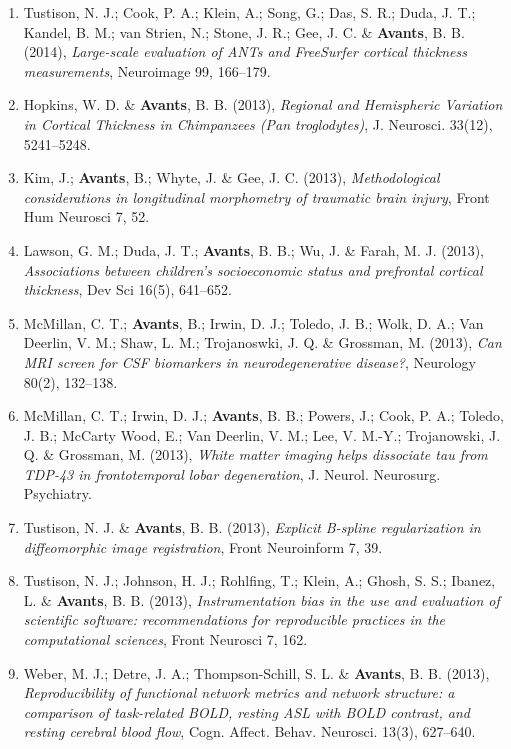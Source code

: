 \documentclass[11pt]{moderncv} %
\begin{document}
\begin{enumerate}
\item  Tustison, N. J.; Cook, P. A.; Klein, A.; Song, G.; Das, S. R.; Duda, J. T.; Kandel, B. M.; van Strien, N.; Stone, J. R.; Gee, J. C. \&  \textbf{Avants}, B. B. (2014), \textit{Large-scale evaluation of ANTs and FreeSurfer cortical thickness measurements}, Neuroimage 99, 166--179.

\item  Hopkins, W. D. \&  \textbf{Avants}, B. B. (2013), \textit{Regional and Hemispheric Variation in Cortical Thickness in Chimpanzees (Pan troglodytes)}, J. Neurosci. 33(12), 5241--5248.

\item  Kim, J.; \textbf{Avants}, B.; Whyte, J. \&  Gee, J. C. (2013), \textit{Methodological considerations in longitudinal morphometry of traumatic brain injury}, Front Hum Neurosci 7, 52.

\item  Lawson, G. M.; Duda, J. T.; \textbf{Avants}, B. B.; Wu, J. \&  Farah, M. J. (2013), \textit{Associations between children's socioeconomic status and prefrontal cortical thickness}, Dev Sci 16(5), 641--652.

\item  McMillan, C. T.; \textbf{Avants}, B.; Irwin, D. J.; Toledo, J. B.; Wolk, D. A.; Van Deerlin, V. M.; Shaw, L. M.; Trojanoswki, J. Q. \&  Grossman, M. (2013), \textit{Can MRI screen for CSF biomarkers in neurodegenerative disease?}, Neurology 80(2), 132--138.

\item  McMillan, C. T.; Irwin, D. J.; \textbf{Avants}, B. B.; Powers, J.; Cook, P. A.; Toledo, J. B.; McCarty Wood, E.; Van Deerlin, V. M.; Lee, V. M.-Y.; Trojanowski, J. Q. \&  Grossman, M. (2013), \textit{White matter imaging helps dissociate tau from TDP-43 in frontotemporal lobar degeneration}, J. Neurol. Neurosurg. Psychiatry.

\item  Tustison, N. J. \&  \textbf{Avants}, B. B. (2013), \textit{Explicit B-spline regularization in diffeomorphic image registration}, Front Neuroinform 7, 39.

\item  Tustison, N. J.; Johnson, H. J.; Rohlfing, T.; Klein, A.; Ghosh, S. S.; Ibanez, L. \&  \textbf{Avants}, B. B. (2013), \textit{Instrumentation bias in the use and evaluation of scientific software: recommendations for reproducible practices in the computational sciences}, Front Neurosci 7, 162.

\item  Weber, M. J.; Detre, J. A.; Thompson-Schill, S. L. \&  \textbf{Avants}, B. B. (2013), \textit{Reproducibility of functional network metrics and network structure: a comparison of task-related BOLD, resting ASL with BOLD contrast, and resting cerebral blood flow}, Cogn. Affect. Behav. Neurosci. 13(3), 627--640.


\end{enumerate}
\end{document}
